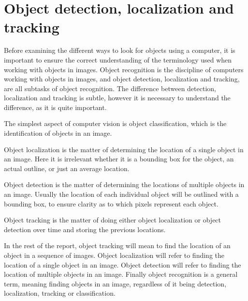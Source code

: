 \section{Object detection, localization and tracking}\label{sec:anal:objdet}
Before examining the different ways to look for objects using a computer, it is important to ensure the correct understanding of the terminology used when working with objects in images.
Object recognition is the discipline of computers working with objects in images, and object detection, localization and tracking, are all subtasks of object recognition.
The difference between detection, localization and tracking is subtle, however it is necessary to understand the difference, as it is quite important\cite{objecttrackdetect}.

The simplest aspect of computer vision is object classification, which is the identification of objects in an image.

Object localization is the matter of determining the location of a single object in an image. 
Here it is irrelevant whether it is a bounding box for the object, an actual outline, or just an average location.

Object detection is the matter of determining the locations of multiple objects in an image.
Usually the location of each individual object will be outlined with a bounding box, to ensure clarity as to which pixels represent each object.

Object tracking is the matter of doing either object localization or object detection over time and storing the previous locations.

In the rest of the report, object tracking will mean to find the location of an object in a sequence of images.
Object localization will refer to finding the location of a single object in an image.
Object detection will refer to finding the location of multiple objects in an image.
Finally object recognition is a general term, meaning finding objects in an image, regardless of it being detection, localization, tracking or classification. 
